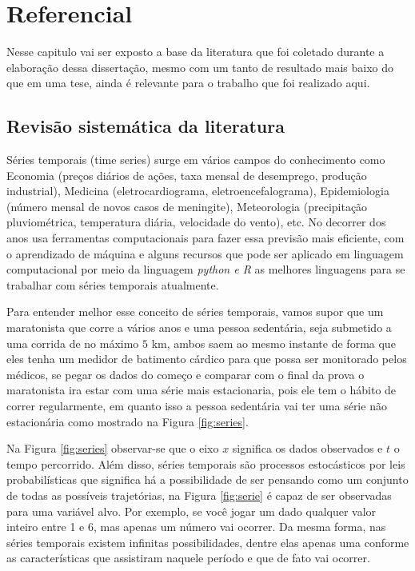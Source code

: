 \section{Referencial}\label{sec:refteo}

Nesse capitulo vai ser exposto a base da literatura que foi coletado durante a elaboração dessa dissertação, mesmo com um tanto de resultado mais baixo do que em uma tese, ainda é relevante para o trabalho que foi realizado aqui.


    

\subsection{Revis\~ao sistem\'atica da literatura} \label{subsec:revisão}

Séries temporais (time series) surge em vários campos do conhecimento como Economia (preços diários de ações, taxa mensal de desemprego, produção industrial), Medicina (eletrocardiograma, eletroencefalograma), Epidemiologia (número mensal de novos casos de meningite), Meteorologia (precipitação pluviométrica, temperatura diária, velocidade do vento), etc. No decorrer dos anos usa ferramentas computacionais para fazer essa previsão mais eficiente, com o aprendizado de máquina e alguns recursos que pode ser aplicado em linguagem computacional por meio da linguagem \textit{python e R}  as melhores linguagens para se trabalhar com séries temporais atualmente.

Para entender melhor esse conceito de séries temporais, vamos supor que um maratonista que corre a vários anos e uma pessoa sedentária, seja submetido a uma corrida de no máximo $5$ km, ambos saem ao mesmo instante de forma que eles tenha um medidor de batimento cárdico para que possa ser monitorado pelos médicos, se pegar os dados do começo e comparar com o final da prova o maratonista ira estar com uma série mais estacionaria, pois ele tem o hábito de correr regularmente, em quanto isso a pessoa sedentária vai ter uma série não estacionária como mostrado na Figura \ref{fig:series}.



Na Figura \ref{fig:series} observar-se que o eixo $x$ significa os dados observados e $t$ o tempo percorrido.
Além disso, séries temporais são processos estocásticos por leis probabilísticas que significa há a possibilidade de ser pensando como um conjunto de todas as possíveis trajetórias, na Figura \ref{fig:serie} é capaz de ser observadas para uma variável alvo. Por exemplo, se você jogar um dado qualquer valor inteiro entre 1 e 6, mas apenas um número vai ocorrer. Da mesma forma, nas séries temporais existem infinitas possibilidades, dentre elas apenas uma conforme as características que assistiram naquele período e que de fato vai ocorrer.

